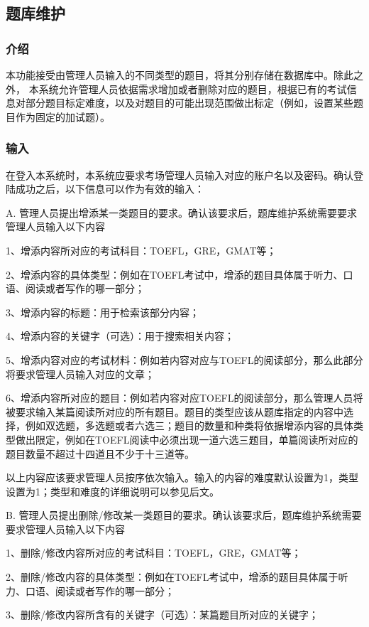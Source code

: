 \subsection{题库维护}

\subsubsection{介绍}
本功能接受由管理人员输入的不同类型的题目，将其分别存储在数据库中。除此之外， 本系统允许管理人员依据需求增加或者删除对应的题目，根据已有的考试信息对部分题目标定难度，以及对题目的可能出现范围做出标定（例如，设置某些题目作为固定的加试题）。

\subsubsection{输入}
在登入本系统时，本系统应要求考场管理人员输入对应的账户名以及密码。确认登陆成功之后，以下信息可以作为有效的输入：

A. 管理人员提出增添某一类题目的要求。确认该要求后，题库维护系统需要要求管理人员输入以下内容

1、增添内容所对应的考试科目：TOEFL，GRE，GMAT等；

2、增添内容的具体类型：例如在TOEFL考试中，增添的题目具体属于听力、口语、阅读或者写作的哪一部分；

3、增添内容的标题：用于检索该部分内容；

4、增添内容的关键字（可选）：用于搜索相关内容；

5、增添内容对应的考试材料：例如若内容对应与TOEFL的阅读部分，那么此部分将要求管理人员输入对应的文章；

6、增添内容所对应的题目：例如若内容对应TOEFL的阅读部分，那么管理人员将被要求输入某篇阅读所对应的所有题目。题目的类型应该从题库指定的内容中选择，例如双选题，多选题或者六选三；题目的数量和种类将依据增添内容的具体类型做出限定，例如在TOEFL阅读中必须出现一道六选三题目，单篇阅读所对应的题目数量不超过十四道且不少于十三道等。

以上内容应该要求管理人员按序依次输入。输入的内容的难度默认设置为1，类型设置为1；类型和难度的详细说明可以参见后文。

B. 管理人员提出删除/修改某一类题目的要求。确认该要求后，题库维护系统需要要求管理人员输入以下内容

1、删除/修改内容所对应的考试科目：TOEFL，GRE，GMAT等；

2、删除/修改内容的具体类型：例如在TOEFL考试中，增添的题目具体属于听力、口语、阅读或者写作的哪一部分；

3、删除/修改内容所含有的关键字（可选）：某篇题目所对应的关键字；

